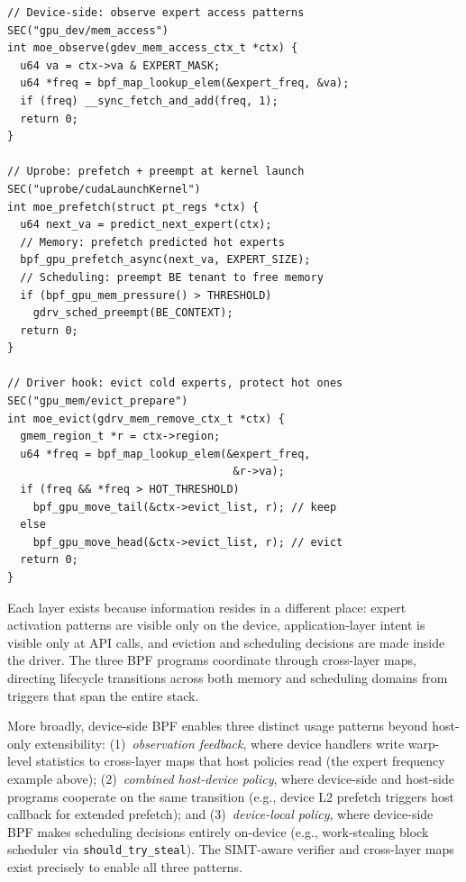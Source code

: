 \begin{lstlisting}
// Device-side: observe expert access patterns
SEC("gpu_dev/mem_access")
int moe_observe(gdev_mem_access_ctx_t *ctx) {
  u64 va = ctx->va & EXPERT_MASK;
  u64 *freq = bpf_map_lookup_elem(&expert_freq, &va);
  if (freq) __sync_fetch_and_add(freq, 1);
  return 0;
}

// Uprobe: prefetch + preempt at kernel launch
SEC("uprobe/cudaLaunchKernel")
int moe_prefetch(struct pt_regs *ctx) {
  u64 next_va = predict_next_expert(ctx);
  // Memory: prefetch predicted hot experts
  bpf_gpu_prefetch_async(next_va, EXPERT_SIZE);
  // Scheduling: preempt BE tenant to free memory
  if (bpf_gpu_mem_pressure() > THRESHOLD)
    gdrv_sched_preempt(BE_CONTEXT);
  return 0;
}

// Driver hook: evict cold experts, protect hot ones
SEC("gpu_mem/evict_prepare")
int moe_evict(gdrv_mem_remove_ctx_t *ctx) {
  gmem_region_t *r = ctx->region;
  u64 *freq = bpf_map_lookup_elem(&expert_freq,
                                   &r->va);
  if (freq && *freq > HOT_THRESHOLD)
    bpf_gpu_move_tail(&ctx->evict_list, r); // keep
  else
    bpf_gpu_move_head(&ctx->evict_list, r); // evict
  return 0;
}
\end{lstlisting}

Each layer exists because information resides in a different place: expert activation patterns are visible only on the device, application-layer intent is visible only at API calls, and eviction and scheduling decisions are made inside the driver. The three BPF programs coordinate through cross-layer maps, directing lifecycle transitions across both memory and scheduling domains from triggers that span the entire stack.

More broadly, device-side BPF enables three distinct usage patterns beyond host-only extensibility: (1)~\emph{observation feedback}, where device handlers write warp-level statistics to cross-layer maps that host policies read (the expert frequency example above); (2)~\emph{combined host-device policy}, where device-side and host-side programs cooperate on the same transition (e.g., device L2 prefetch triggers host callback for extended prefetch); and (3)~\emph{device-local policy}, where device-side BPF makes scheduling decisions entirely on-device (e.g., work-stealing block scheduler via \texttt{should\_try\_steal}). The SIMT-aware verifier and cross-layer maps exist precisely to enable all three patterns.

